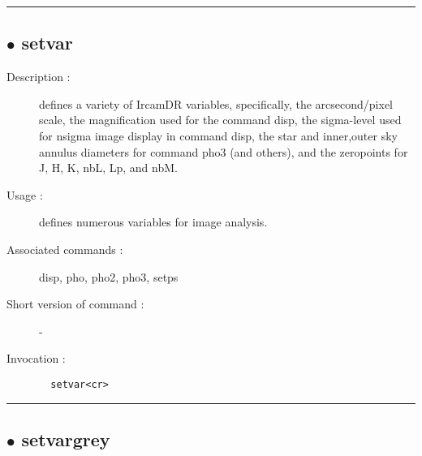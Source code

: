 \hrule \subsection*{$\bullet$ setvar}
\begin{description}
\item[Description :] defines a variety of IrcamDR variables, specifically, the
arcsecond/pixel scale, the magnification used for the command disp, the
sigma-level used for nsigma image display in command disp, the star and
inner,outer sky annulus diameters for command pho3 (and others), and the
zeropoints for J, H, K, nbL, Lp, and nbM.
\item[Usage :] defines numerous variables for image analysis.
\item[Associated commands :] disp, pho, pho2, pho3, setps
\item[Short version of command :] -
\item[Invocation :]

\verb+  setvar<cr> +\end{description}

\hrule \subsection*{$\bullet$ setvargrey}

